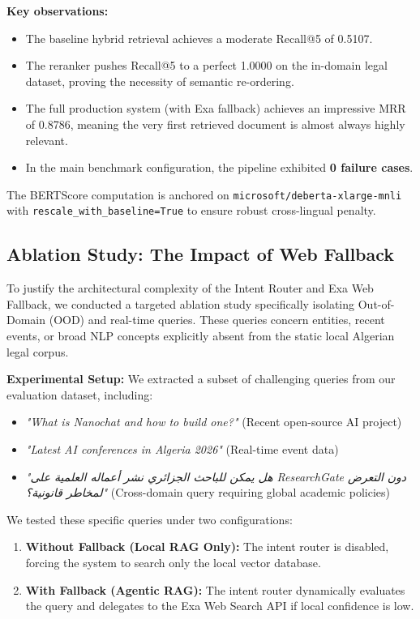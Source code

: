 \documentclass[12pt, a4paper]{article}
\begin{document}
\textbf{Key observations:}
\begin{itemize}[leftmargin=2em]
  \item The baseline hybrid retrieval achieves a moderate Recall@5 of 0.5107.
  \item The reranker pushes Recall@5 to a perfect 1.0000 on the in-domain legal dataset, proving the necessity of semantic re-ordering.
  \item The full production system (with Exa fallback) achieves an impressive MRR of 0.8786, meaning the very first retrieved document is almost always highly relevant.
  \item In the main benchmark configuration, the pipeline exhibited \textbf{0 failure cases}.
\end{itemize}

\begin{notebox}
The BERTScore computation is anchored on \texttt{microsoft/deberta-xlarge-mnli} with \texttt{rescale\_with\_baseline=True} to ensure robust cross-lingual penalty.
\end{notebox}

\subsection{Ablation Study: The Impact of Web Fallback}

To justify the architectural complexity of the Intent Router and Exa Web Fallback, we conducted a targeted ablation study specifically isolating Out-of-Domain (OOD) and real-time queries. These queries concern entities, recent events, or broad NLP concepts explicitly absent from the static local Algerian legal corpus.

\textbf{Experimental Setup:}
We extracted a subset of challenging queries from our evaluation dataset, including:
\begin{itemize}[leftmargin=2em]
    \item \textit{"What is Nanochat and how to build one?"} (Recent open-source AI project)
    \item \textit{"Latest AI conferences in Algeria 2026"} (Real-time event data)
    \item \textit{"هل يمكن للباحث الجزائري نشر أعماله العلمية على ResearchGate دون التعرض لمخاطر قانونية؟"} (Cross-domain query requiring global academic policies)
\end{itemize}

We tested these specific queries under two configurations:
\begin{enumerate}[leftmargin=2em]
    \item \textbf{Without Fallback (Local RAG Only):} The intent router is disabled, forcing the system to search only the local vector database.
    \item \textbf{With Fallback (Agentic RAG):} The intent router dynamically evaluates the query and delegates to the Exa Web Search API if local confidence is low.
\end{enumerate}
\end{document}

